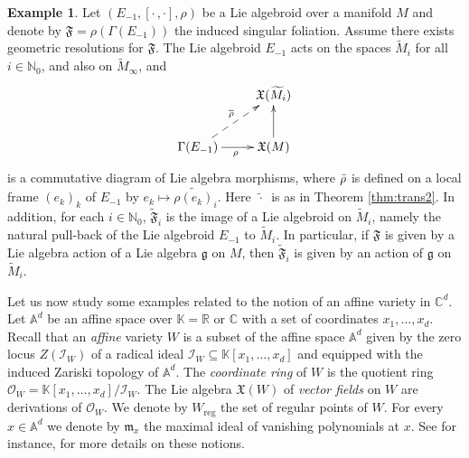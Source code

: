 \documentclass[10pt]{article}
\theoremstyle{plain}
\theoremstyle{definition}
\newtheorem{example}[lemma]{Example}
\theoremstyle{remark}
\newcommand{\lb}{\left[ \cdot\,,\cdot\right] }
\begin{document}
   \begin{example}
Let $(E_{-1}, \lb, \rho)$ be a Lie algebroid over a manifold $M$ and  denote by $\mathfrak F= \rho(\Gamma(E_{-1}))$ the induced singular foliation. Assume there exists geometric resolutions for $\mathfrak F$. The Lie algebroid $E_{-1}$ acts on  the spaces $\widetilde M_i$ for all $i\in \mathbb N_0$, and also on $\widetilde M_\infty$, and \begin{equation}
    \xymatrix{&\mathfrak{X}(\widetilde M_i)\ar@{<-}[d] \\\Gamma(E_{-1})\ar@{-->}[ru]^{\overline{\rho}}\ar[r]_{\rho}& \mathfrak{X}(M)}
\end{equation} is a commutative diagram of Lie algebra morphisms, where $\Bar{\rho}$ is defined on a local frame $(e_k)_k$ of $E_{-1}$ by $e_k\mapsto \widetilde {\rho(e_k)}_i$. Here\, $\widetilde \cdot$\, is as in Theorem \ref{thm:trans2}. In addition, for each $i\in \mathbb N_0$, $\widetilde {\mathfrak F}_i$  is the image of a Lie algebroid on $\widetilde M_i$, namely the natural  pull-back  of the Lie algebroid $E_{-1}$ to $\widetilde M_i$. {In particular, if  $\mathfrak F$ is given by a Lie algebra action of a Lie algebra $\mathfrak g$ on $M$, then $\widetilde{\mathfrak F}_i$ is given by an action of $\mathfrak g$ on $\widetilde M_i$.}
   \end{example}


Let us now study some examples related to the notion of an affine variety in $\mathbb C^d$.\\

Let $\mathbb{A}^d$ be an affine space over $\mathbb{K}=\mathbb R$ or $ \mathbb C$ with a set of coordinates $x_1,\ldots, x_d$. Recall that an \emph{affine} variety $W$ is a subset of the affine space $\mathbb{A}^d$ given by the zero locus $Z(\mathcal{I}_W)$ of a radical ideal $\mathcal{I}_W\subseteq\mathbb{K}[x_1,\ldots, x_d]$ and equipped with the induced Zariski topology of $\mathbb{A}^d$. The \emph{coordinate ring} of $W$ is the quotient ring  $\mathcal O_W=\mathbb{K}[x_1,\ldots, x_d]/\mathcal{I}_W$. The Lie algebra $\mathfrak{X}(W)$ of \emph{vector fields} on $W$ are  derivations of $\mathcal O_W$. %
We denote by $W_{\mathrm {reg}}$ the set of regular points  of $W$. For every $x\in \mathbb A^d$ we denote by $\mathfrak m_x$ the maximal ideal of vanishing polynomials at $x$. See for instance, \cite{Hartshorne} for more details on these notions. 
\end{document}
